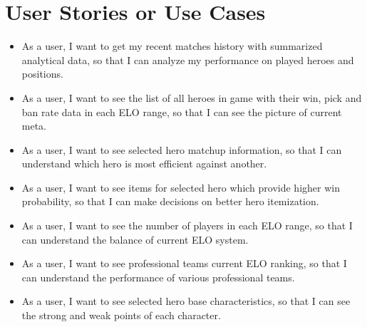 \section{User Stories or Use Cases}

\begin{itemize}

    \item As a user, I want to get my recent matches history with summarized analytical data,
    so that I can analyze my performance on played heroes and positions.
    \item As a user, I want to see the list of all heroes in game with their win, pick
    and ban rate data in each ELO range, so that I can see the picture of current meta.
    \item As a user, I want to see selected hero matchup information,
    so that I can understand which hero is most efficient against another.
    \item As a user, I want to see items for selected hero which provide higher win probability,
    so that I can make decisions on better hero itemization.
    \item As a user, I want to see the number of players in each ELO range,
    so that I can understand the balance of current ELO system.
    \item As a user, I want to see professional teams current ELO ranking,
    so that I can understand the performance of various professional teams.
    \item As a user, I want to see selected hero base characteristics,
    so that I can see the strong and weak points of each character.

\end{itemize}